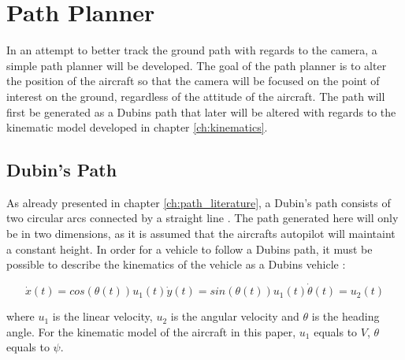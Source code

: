\section{Path Planner}

In an attempt to better track the ground path with regards to the camera, a simple path planner will be developed. The goal of the path planner is to alter the position of the aircraft so that the camera will be focused on the point of interest on the ground, regardless of the attitude of the aircraft. The path will first be generated as a Dubins path that later will be altered with regards to the kinematic model developed in chapter \ref{ch:kinematics}.


\subsection{Dubin's Path}
\label{ch:dubins_path}

As already presented in chapter \ref{ch:path_literature}, a Dubin's path consists of two circular arcs connected by a straight line \cite{DUBIN}. The path generated here will only be in two dimensions, as it is assumed that the aircrafts autopilot will maintaint a constant height. In order for a vehicle to follow a Dubins path, it must be possible to describe the kinematics of the vehicle as a Dubins vehicle \cite{dubinYONG}:

\begin{subequations}
\begin{equation}
	\dot{x}(t) = cos(\theta(t))u_1(t)
\end{equation}
\begin{equation}
	\dot{y}(t) = sin(\theta(t))u_1(t)
\end{equation}
\begin{equation}
	\dot{\theta}(t) = u_2(t)
\end{equation}
\end{subequations}

where $u_1$ is the linear velocity, $u_2$ is the angular velocity and $\theta$ is the heading angle. For the kinematic model of the aircraft in this paper, $u_1$ equals to $V$, $\theta$ equals to $\psi$.


